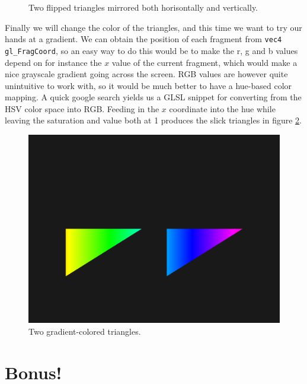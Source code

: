 \documentclass[]{article}
\begin{document}
\begin{multicols}{2}
\begin{figure}[H]
\caption{Two flipped triangles mirrored both horisontally and vertically.}
\label{fig:tris_mirrored}
\end{figure}
Finally we will change the color of the triangles, and this time we want to try our hands at a gradient. We can obtain the position of each fragment from \texttt{vec4 gl\_FragCoord}, so an easy way to do this would be to make the r, g and b values depend on for instance the $x$ value of the current fragment, which would make a nice grayscale gradient going across the screen. RGB values are however quite unintuitive to work with, so it would be much better to have a hue-based color mapping. A quick google search yields us a GLSL snippet for converting from the HSV color space into RGB. Feeding in the $x$ coordinate into the hue while leaving the saturation and value both at 1 produces the slick triangles in figure \ref{fig:tris_wavy}.
\begin{figure}[H]
\centering
\includegraphics[width=\columnwidth]{mirrored_color_tris.png}
\caption{Two gradient-colored triangles.}
\label{fig:tris_wavy}
\end{figure}

\section{Bonus!}

\end{multicols}
\end{document}

